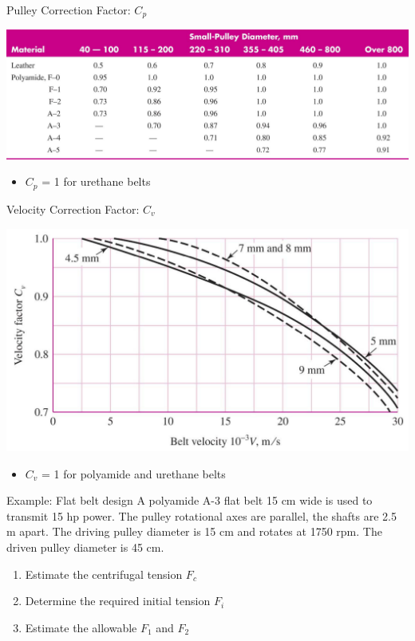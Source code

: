 \documentclass[10pt, svgnames]{beamer}
\begin{document}
\begin{frame}[label={sec:orgd6ce725}]{Pulley Correction Factor: \(C_p\)}
\begin{center}
\includegraphics[width=\textwidth]{./pictures/pulley-correction-factor.png}
\end{center}

\begin{itemize}
\item \(C_p\) = 1 for urethane belts
\end{itemize}
\end{frame}

\begin{frame}[label={sec:orgdcf1b81}]{Velocity Correction Factor: \(C_v\)}
\begin{center}
\includegraphics[width=\textwidth]{./pictures/velocity-correction-factor.png}
\end{center}

\begin{itemize}
\item \(C_v\) = 1 for polyamide and urethane belts
\end{itemize}
\end{frame}

\begin{frame}[label={sec:org52e7e8d}]{Example: Flat belt design}
A polyamide A-3 flat belt 15 cm wide is used to transmit 15 hp power. The pulley rotational axes are parallel, the shafts are 2.5 m apart. The driving pulley diameter is 15 cm and rotates at 1750 rpm. The driven pulley diameter is 45 cm.

\begin{enumerate}
\item Estimate the centrifugal tension \(F_c\)
\item Determine the required initial tension \(F_{i}\)
\item Estimate the allowable \(F_1\) and \(F_2\)
\end{enumerate}
\end{frame}
\end{document}
